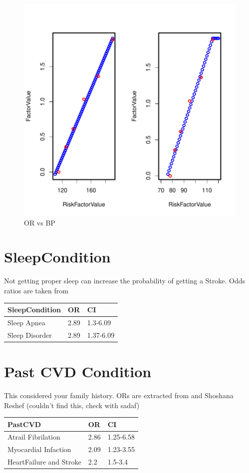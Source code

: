 \documentclass{report}
\begin{document}
\begin{figure}[b!]
\centering
\includegraphics{EPFL-BP}
\caption{OR vs BP}
\end{figure}


\newpage
\section{\color{blue}SleepCondition}
Not getting proper sleep can increase the probability of getting a Stroke. Odds ratios are taken from \cite{Dyken2009}
\newline \newline
\begin{tabular}{|l|l|l|}
\hline
SleepCondition & OR & CI\\ \hline
Sleep Apnea & 2.89 & 1.3-6.09\\ \hline
Sleep Disorder & 2.89 & 1.37-6.09\\ \hline
\end{tabular}


\newpage
\section{\color{blue}Past CVD Condition}
This considered your family history. ORs are extracted from \cite{Pullicino2009} and Shoshana Reshef (couldn't find this, check with sadaf)
\newline \newline
\begin{tabular}{|l|l|l|}
\hline
PastCVD & OR & CI\\ \hline
Atrail Fibrilation & 2.86 & 1.25-6.58\\ \hline
Myocardial Infaction & 2.09 & 1.23-3.55\\ \hline
HeartFailure and Stroke & 2.2 & 1.5-3.4\\ \hline
\end{tabular}
\end{document}
